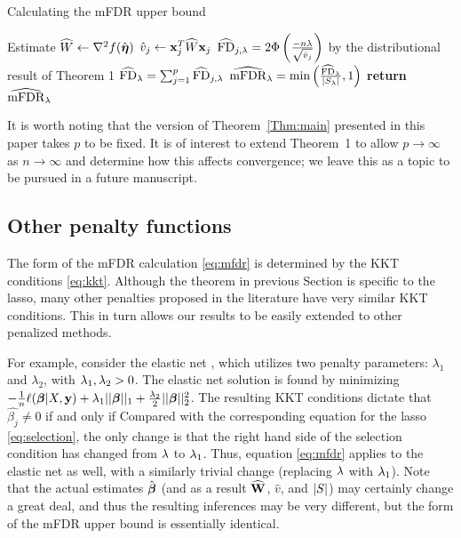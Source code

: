 \begin{algorithm*}
\caption{Calculating the mFDR upper bound}\label{Alg:mfdr}
\begin{algorithmic}[10]
\Procedure{}{}
	\State Estimate $\widehat{W} \gets \nabla^2f(\hat{\boldsymbol{\eta}})$
		\State $\hat{v}_j \gets \mathbf{x}_j^T\widehat{W}\mathbf{x}_j$
		\State $\widehat{\textrm{FD}}_{j, \lambda} = 2 \Phi \left(\frac{-n\lambda}{\sqrt{\hat{v}_j}}\right)$  by the distributional result of Theorem 1
	\EndFor
	\State $\widehat{\textrm{FD}}_\lambda =  \sum_{j=1}^{p} \widehat{\textrm{FD}}_{j, \lambda}$
	\State $\widehat{\textrm{mFDR}}_\lambda = \text{min}\left(\frac{\widehat{\textrm{FD}}_\lambda}{|S_\lambda|}, 1 \right)$
\EndProcedure
\State \textbf{return} $\widehat{\textrm{mFDR}}_\lambda $
\end{algorithmic}
\end{algorithm*}

It is worth noting that the version of Theorem~\ref{Thm:main} presented in this paper takes $p$ to be fixed.  It is of interest to extend Theorem~1 to allow $p \to \infty$ as $n \to \infty$ and determine how this affects convergence; we leave this as a topic to be pursued in a future manuscript.

\subsection{Other penalty functions}

The form of the mFDR calculation \eqref{eq:mfdr} is determined by the KKT conditions \eqref{eq:kkt}.  Although the theorem in previous Section is specific to the lasso, many other penalties proposed in the literature have very similar KKT conditions. This in turn allows our results to be easily extended to other penalized methods.

For example, consider the elastic net \citep{Elastic_Net}, which utilizes two penalty parameters: $\lambda_1$ and $\lambda_2$, with $\lambda_1, \lambda_2 >0$. The elastic net solution is found by minimizing $-\frac{1}{n} \ell(\boldsymbol{\beta}|X,\mathbf{y}) + \lambda_1 ||\boldsymbol{\beta}||_1 + \frac{\lambda_2}{2}||\boldsymbol{\beta}||_{2}^2 $. The resulting KKT conditions dictate that $\hat{\beta_j} \neq 0$ if and only if
Compared with the corresponding equation for the lasso \eqref{eq:selection}, the only change is that the right hand side of the selection condition has changed from $\lambda$ to $\lambda_1$.  Thus, equation \eqref{eq:mfdr} applies to the elastic net as well, with a similarly trivial change (replacing $\lambda$ with $\lambda_1$).  Note that the actual estimates $\hat{\boldsymbol{\beta}}$ (and as a result $\widehat{\mathbf{W}}$, $\hat{v}$, and $\left\lvert S\right\rvert$) may certainly change a great deal, and thus the resulting inferences may be very different, but the form of the mFDR upper bound is essentially identical.

